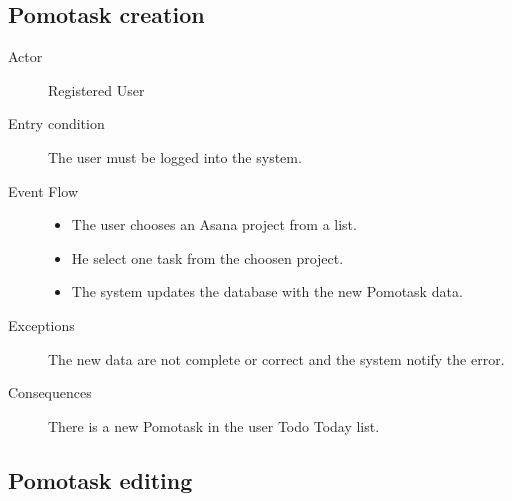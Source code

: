 		\subsection{Pomotask creation}

			\begin{description}

				\item[Actor] Registered User
			
				\item[Entry condition] The user must be logged into the system.

				\item[Event Flow]\hfill

					\begin{itemize}

						\item The user chooses an Asana project from a list.

						\item He select one task from the choosen project.

						\item The system updates the database with the new Pomotask data.

					\end{itemize}

				\item[Exceptions] The new data are not complete or correct and the system notify the error.

				\item[Consequences] There is a new Pomotask in the user Todo Today list.

			\end{description}

		\subsection{Pomotask editing}

